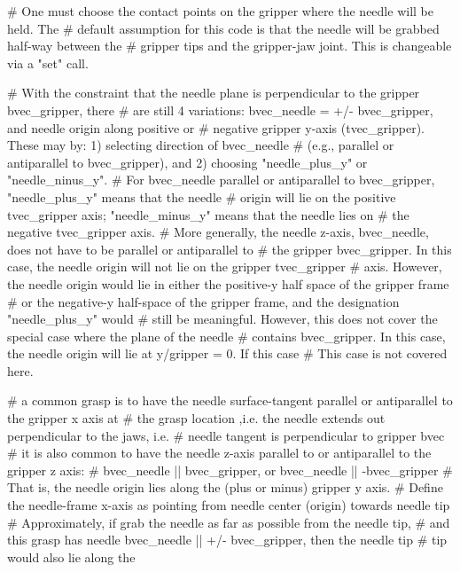 \begin{DoxyVerb}
# One must choose the contact points on the gripper where the needle will be held.  The
# default assumption for this code is that the needle will be grabbed half-way between the
# gripper tips and the gripper-jaw joint.  This is changeable via a "set" call.

# With the constraint that the needle plane is perpendicular to the gripper bvec_gripper, there
# are still 4 variations: bvec_needle = +/- bvec_gripper, and needle origin along positive or
# negative gripper y-axis (tvec_gripper).  These may by: 1) selecting direction of bvec_needle
#  (e.g., parallel or antiparallel to bvec_gripper), and 2) choosing "needle_plus_y" or "needle_ninus_y".
# For bvec_needle parallel or antiparallel to bvec_gripper, "needle_plus_y" means that the needle 
# origin will lie on the positive tvec_gripper axis; "needle_minus_y" means that the needle lies on
# the negative tvec_gripper axis.
# More generally, the needle z-axis, bvec_needle, does not have to be parallel or antiparallel to
# the gripper bvec_gripper.  In this case, the needle origin will not lie on the gripper tvec_gripper
# axis.  However, the needle origin would lie in either the positive-y half space of the gripper frame
# or the negative-y half-space of the gripper frame, and the designation "needle_plus_y" would
# still be meaningful.  However, this does not cover the special case where the plane of the needle
# contains bvec_gripper.  In this case, the needle origin will lie at y/gripper = 0.  If this case
# This case is not covered here.


# a common grasp is to have the needle surface-tangent parallel or antiparallel to the gripper x axis at 
#  the grasp location ,i.e. the needle extends out perpendicular to the jaws, i.e.
#  needle tangent  is perpendicular to gripper bvec
# it is also common to have the needle z-axis parallel to or antiparallel to the gripper z axis:
# bvec_needle || bvec_gripper, or bvec_needle || -bvec_gripper
#  That is, the needle origin lies along the (plus or minus) gripper y axis.
# Define the needle-frame x-axis as pointing from needle center (origin) towards needle tip
# Approximately, if grab the needle as far as possible from the needle tip, 
# and this grasp has needle bvec_needle || +/- bvec_gripper, then the needle tip 
# tip would also lie along the\end{DoxyVerb}
 